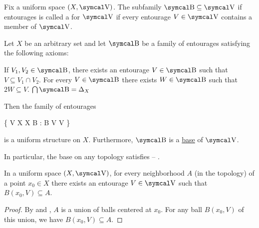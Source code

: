 \begin{definition}\label{def:uniform_space_base}
  Fix a uniform space \( (X, \CV) \). The subfamily \( \CB \subseteq \CV \) if entourages is called a  for \( \CV \) if every entourage \( V \in \CV \) contains a member of \( \CV \).
\end{definition}

\begin{definition}\label{thm:uniform_space_base_axioms}
  Let \( X \) be an arbitrary set and let \( \CB \) be a family of entourages satisfying the following axioms:
  \begin{DefEnum}
     If \( V_1, V_2 \in \CB \), there exists an entourage \( V \in \CB \) such that \( V \subseteq V_1 \cap V_2 \).
     For every \( V \in \CB \) there exists \( W \in \CB \) such that \( 2W \subseteq V \).
     \( \bigcap \CB = \Delta_X \)
  \end{DefEnum}

  Then the family of entourages
  \begin{BreakableAlign}\label{thm:uniform_space_base_axioms/uniformity}
    \CV \coloneqq \left\{ V \subseteq X \times X \colon \exists B \in \CB: B \in V  V  \right\}
  \end{BreakableAlign}
  is a uniform structure on \( X \). Furthermore, \( \CB \) is a \hyperref[def:uniform_space_base]{base} of \( \CV \).

  In particular, the base on any topology satisfies  -- .
\end{definition}

\begin{lemma}\label{thm:uniform_space_neighborhood_contains_ball}
  In a uniform space \( (X, \CV) \), for every neighborhood \( A \) (in the topology) of a point \( x_0 \in X \) there exists an entourage \( V \in \CV \) such that \( B(x_0, V) \subseteq A \).
\end{lemma}
\begin{proof}
  By  and , \( A \) is a union of balls centered at \( x_0 \). For any ball \( B(x_0, V) \) of this union, we have \( B(x_0, V) \subseteq A \).
\end{proof}


